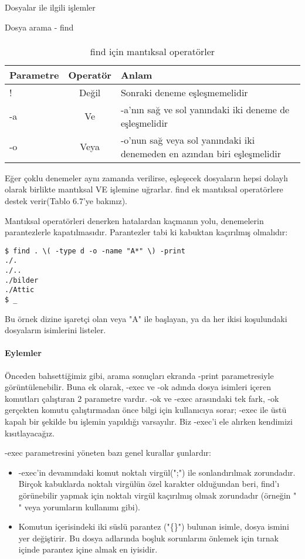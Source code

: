 \documentclass[10pt,a5paper]{book}
\begin{document}
\begin{section}{Dosyalar ile ilgili işlemler}
\begin{subsection}{Dosya arama - find}
\paragraph{}{
\begin {table}[H]
\caption {find için mantıksal operatörler} \label{tab:title} 
\begin{tabular}{l c l}
\hline
Parametre & Operatör & Anlam\\
\hline
! & Değil & Sonraki deneme eşleşmemelidir\\
-a & Ve & -a'nın sağ ve sol yanındaki iki deneme de eşleşmelidir\\
-o & Veya & -o'nun sağ veya sol yanındaki iki denemeden en azından biri eşleşmelidir\\
\hline
\end{tabular}
\end {table}
}

Eğer çoklu denemeler aynı zamanda verilirse, eşleşecek dosyaların hepsi dolaylı olarak birlikte mantıksal VE işlemine uğrarlar. find ek mantıksal operatörlere destek verir(Tablo 6.7'ye bakınız).

Mantıksal operatörleri denerken hatalardan kaçmanın yolu, denemelerin parantezlerle kapatılmasıdır. Parantezler tabi ki kabuktan kaçırılmış olmalıdır:

\begin{verbatim}
$ find . \( -type d -o -name "A*" \) -print
./.
./..
./bilder
./Attic
$ _
\end{verbatim}

Bu örnek dizine işaretçi olan veya "A" ile başlayan, ya da her ikisi koşulundaki dosyaların isimlerini listeler.

\paragraph{Eylemler} Önceden bahsettiğimiz gibi, arama sonuçları ekranda -print parametresiyle görüntülenebilir. Buna ek olarak, -exec ve -ok adında dosya isimleri içeren komutları çalıştıran 2 parametre vardır. -ok ve -exec arasındaki tek fark, -ok gerçekten komutu çalıştırmadan önce bilgi için kullanıcıya sorar; -exec ile üstü kapalı bir şekilde bu işlemin yapıldığı varsayılır. Biz -exec'i ele alırken kendimizi kısıtlayacağız.

-exec parametresini yöneten bazı genel kurallar şunlardır:
\begin{itemize}
\item -exec'in devamındaki komut noktalı virgül(";") ile sonlandırılmak zorundadır. Birçok kabuklarda noktalı virgülün özel karakter olduğundan beri, find'ı görünebilir yapmak için noktalı virgül kaçırılmış olmak zorundadır (örneğin "\\" veya yorumların kullanımı gibi).
\item Komutun içerisindeki iki süslü parantez ("\{\}") bulunan isimle, dosya ismini yer değiştirir. Bu dosya adlarında boşluk sorunlarını önlemek için tırnak içinde parantez içine almak en iyisidir.
\end{itemize}


\end{subsection}
\end{section}
\end{document}
